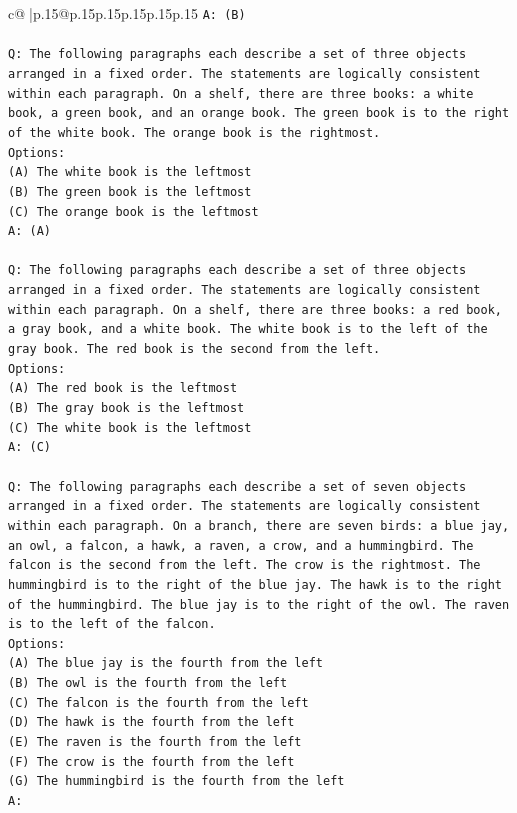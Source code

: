 \documentclass{article}
\begin{document}
{\begin{supertabular}{c@{$\;$}|p{.15\linewidth}@{}p{.15\linewidth}p{.15\linewidth}p{.15\linewidth}p{.15\linewidth}p{.15\linewidth}}
{{{\texttt{A: (B)} \\
\\ 
\texttt{Q: The following paragraphs each describe a set of three objects arranged in a fixed order. The statements are logically consistent within each paragraph. On a shelf, there are three books: a white book, a green book, and an orange book. The green book is to the right of the white book. The orange book is the rightmost.} \\
\texttt{Options:} \\
\texttt{(A) The white book is the leftmost} \\
\texttt{(B) The green book is the leftmost} \\
\texttt{(C) The orange book is the leftmost} \\
\texttt{A: (A)} \\
\\ 
\texttt{Q: The following paragraphs each describe a set of three objects arranged in a fixed order. The statements are logically consistent within each paragraph. On a shelf, there are three books: a red book, a gray book, and a white book. The white book is to the left of the gray book. The red book is the second from the left.} \\
\texttt{Options:} \\
\texttt{(A) The red book is the leftmost} \\
\texttt{(B) The gray book is the leftmost} \\
\texttt{(C) The white book is the leftmost} \\
\texttt{A: (C)} \\
\\ 
\texttt{Q: The following paragraphs each describe a set of seven objects arranged in a fixed order. The statements are logically consistent within each paragraph. On a branch, there are seven birds: a blue jay, an owl, a falcon, a hawk, a raven, a crow, and a hummingbird. The falcon is the second from the left. The crow is the rightmost. The hummingbird is to the right of the blue jay. The hawk is to the right of the hummingbird. The blue jay is to the right of the owl. The raven is to the left of the falcon.} \\
\texttt{Options:} \\
\texttt{(A) The blue jay is the fourth from the left} \\
\texttt{(B) The owl is the fourth from the left} \\
\texttt{(C) The falcon is the fourth from the left} \\
\texttt{(D) The hawk is the fourth from the left} \\
\texttt{(E) The raven is the fourth from the left} \\
\texttt{(F) The crow is the fourth from the left} \\
\texttt{(G) The hummingbird is the fourth from the left} \\
\texttt{A:} \\
            }
        }
    }
     \\ \\


\end{supertabular}}
\end{document}
